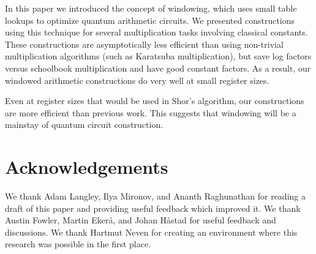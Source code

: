 \documentclass[onecolumn,unpublished]{quantumarticle}
\theoremstyle{definition}
\theoremstyle{definition}
\theoremstyle{definition}
\begin{document}
In this paper we introduced the concept of windowing, which uses small table lookups to optimize quantum arithmetic circuits.
We presented constructions using this technique for several multiplication tasks involving classical constants.
These constructions are asymptotically less efficient than using non-trivial multiplication algorithms (such as Karatsuba multiplication), but save log factors versus schoolbook multiplication and have good constant factors.
As a result, our windowed arithmetic constructions do very well at small register sizes.

Even at register sizes that would be used in Shor's algorithm, our constructions are more efficient than previous work.
This suggests that windowing will be a mainstay of quantum circuit construction.


\section{Acknowledgements}
We thank Adam Langley, Ilya Mironov, and Ananth Raghunathan for reading a draft of this paper and providing useful feedback which improved it.
We thank Austin Fowler, Martin Ekerå, and Johan Håstad for useful feedback and discussions.
We thank Hartmut Neven for creating an environment where this research was possible in the first place.



\end{document}
